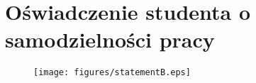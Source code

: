 \appendix
\chapter{Oświadczenie studenta o samodzielności pracy}
\label{appendix:A}

\begin{figure}[H]
  \centering
  \texttt{[image: figures/statementB.eps]}
\end{figure}


